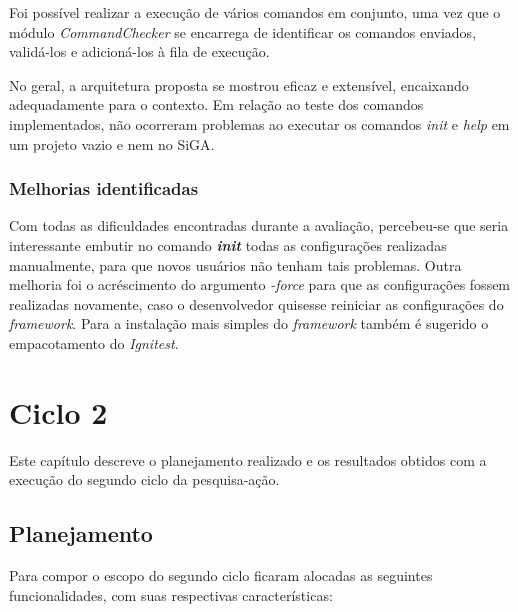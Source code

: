 	  Foi possível realizar a execução de vários comandos em conjunto, uma vez que o módulo \textit{CommandChecker} se encarrega 
	  de identificar os comandos enviados, validá-los e adicioná-los à fila de execução.
	  
	  No geral, a arquitetura proposta se mostrou eficaz e extensível, encaixando adequadamente para o contexto.
	  Em relação ao teste dos comandos implementados, não ocorreram problemas ao executar os comandos \textit{init} e
	  \textit{help} em um projeto vazio e nem no SiGA.
	  

    \subsection{Melhorias identificadas}
	   Com todas as dificuldades encontradas durante a avaliação, percebeu-se que seria interessante embutir no comando 
	   \textit{\textbf{init}} todas as configurações realizadas manualmente, para que novos usuários não tenham tais problemas. Outra melhoria foi o acréscimento do argumento 
     \textit{-force} para que as configurações fossem realizadas novamente, caso o desenvolvedor quisesse reiniciar as configurações do \textit{framework}.
     Para a instalação mais simples do \textit{framework} também é sugerido o empacotamento do \textit{Ignitest}.
    

\chapter{Ciclo 2}

  Este capítulo descreve o planejamento realizado e os resultados obtidos com a execução do segundo ciclo da pesquisa-ação.
  
  \section{Planejamento}
  
    Para compor o escopo do segundo ciclo ficaram alocadas as seguintes funcionalidades, com suas respectivas características:
    
